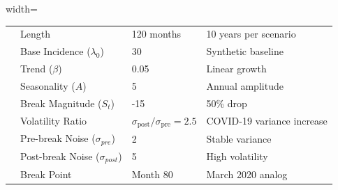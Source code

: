 \documentclass[final,3p,times,twocolumn,authoryear]{elsarticle}
\begin{document}
\begin{table}[htbp]
\begin{adjustbox}{width=\textwidth}
\begin{tabular}{llp{3cm}p{6cm}}
                    & Length & 120 months & 10 years per scenario \\
                    & Base Incidence ($\lambda_0$) & 30 & Synthetic baseline \\
                    & Trend ($\beta$) & 0.05 & Linear growth \\
                    & Seasonality ($A$) & 5 & Annual amplitude \\
                    & Break Magnitude ($S_t$) & -15 & 50\% drop \\
                    & Volatility Ratio & $\sigma_{\text{post}}/\sigma_{\text{pre}} = 2.5$ & COVID-19 variance increase \\
                    & Pre-break Noise ($\sigma_{pre}$) & 2 & Stable variance \\
                    & Post-break Noise ($\sigma_{post}$) & 5 & High volatility \\
                    & Break Point & Month 80 & March 2020 analog \\
\bottomrule
\end{tabular}
\end{adjustbox}
\end{table}

\clearpage
\twocolumn


\end{document}
